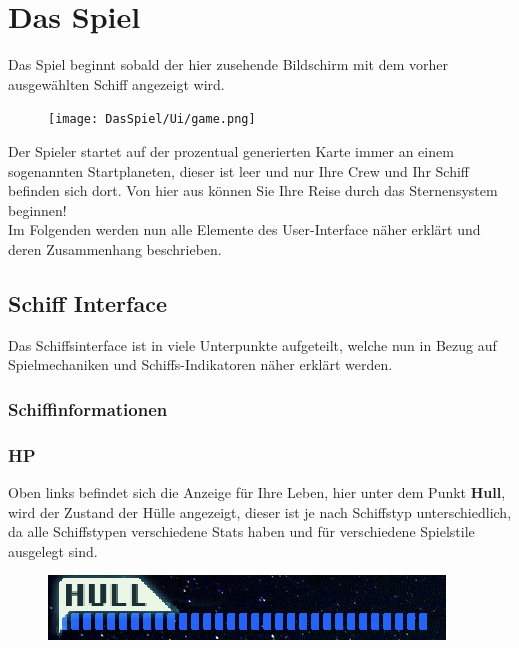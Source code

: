 \documentclass[fontsize=12pt,paper=a4,twoside]{scrartcl}
\begin{document}
\newpage
\section{Das Spiel}
Das Spiel beginnt sobald der hier zusehende Bildschirm mit dem vorher ausgewählten Schiff angezeigt wird. 
\begin{figure}[H]
\centering
\texttt{[image: DasSpiel/Ui/game.png]}
\end{figure} 

Der Spieler startet auf der prozentual generierten Karte immer an einem sogenannten Startplaneten, dieser ist leer und nur Ihre Crew und Ihr Schiff befinden sich dort. Von hier aus können Sie Ihre Reise durch das Sternensystem beginnen!  
\\
Im Folgenden werden nun alle Elemente des User-Interface näher erklärt und deren Zusammenhang beschrieben.


\subsection{Schiff Interface}

Das Schiffsinterface ist in viele Unterpunkte aufgeteilt, welche nun in Bezug auf Spielmechaniken und Schiffs-Indikatoren näher erklärt werden.
\\


\subsubsection{Schiffinformationen}
\subsubsection{HP}
Oben links befindet sich die Anzeige für Ihre Leben, hier unter dem Punkt \textbf{Hull}, wird der Zustand der Hülle angezeigt, dieser ist je nach Schiffstyp unterschiedlich, da alle Schiffstypen verschiedene Stats haben und für verschiedene Spielstile ausgelegt sind. 

\begin{figure}[H]
\centering
\includegraphics[width=0.8\linewidth]{DasSpiel/Ui/HP.png}
\end{figure} 
\end{document}
